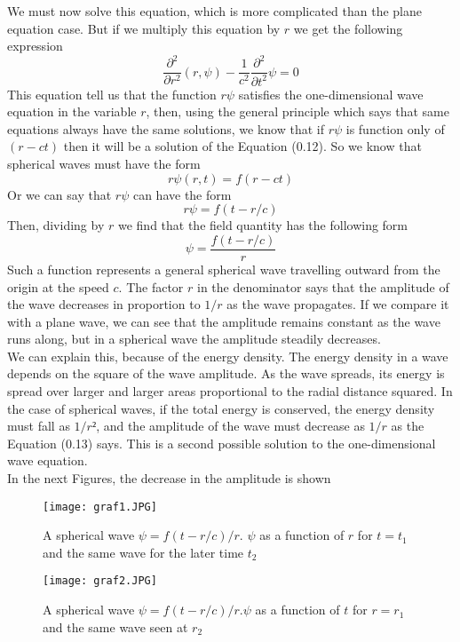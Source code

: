 \documentclass[paper=a4, fontsize=11pt]{scrartcl} %
\numberwithin{equation}{section} %
\numberwithin{figure}{section} %
\numberwithin{table}{section} %
\begin{document}
We must now solve this equation, which is more complicated than the plane equation case. But if we multiply this equation by $r$ we get the following 
expression
\begin{equation}
 \frac{\partial^2 }{\partial r^2}(r,\psi)-\frac{1}{c^2}\frac{\partial^2 }{\partial t^2}\psi=0
\end{equation}
This equation tell us that the function $r\psi$ satisfies the one-dimensional wave equation in the variable $r$, then, using the general principle
which says that same equations always have the same solutions, we know that if $r\psi$ is function only of $(r-ct)$ then it will be a solution of
the Equation (0.12). So we know that spherical waves must have the form
$$ r\psi(r,t)= f(r-ct)$$
Or we can say that $r\psi$ can have the form
$$ r\psi= f(t-r/c)$$
Then, dividing by $r$ we find that the field quantity has the following form
\begin{equation}
 \psi=\frac {f(t-r/c)}{r}
\end{equation}
Such a function represents a general spherical wave travelling outward from the origin at the speed $c$. The factor $r$ in the denominator says that
the amplitude of the wave decreases in proportion to $1/r$ as the wave propagates. If we compare it with a plane wave, we can see that the amplitude
remains constant as the wave runs along, but in a spherical wave the amplitude steadily decreases. \\
We can explain this, because of the energy density. The energy density in a wave depends on the square of the wave amplitude. As the wave spreads,
its energy is spread over larger and larger areas proportional to the radial distance squared. In the case of spherical waves, if the total 
energy is conserved, the energy density must fall as $1/r²$, and the amplitude of the wave must decrease as $1/r$ as the Equation (0.13) says. This 
is a second possible solution to the one-dimensional wave equation.\\
In the next Figures, the decrease in the amplitude is shown
\begin{figure}[h!] 
\centering
\texttt{[image: graf1.JPG]}
\caption{A spherical wave $\psi= {f(t-r/c)}/{r}$. $\psi$ as a function of $r$ for $t=t_1$ and the same wave for the later time $t_2$}
\label{graf1.JPG}
\end{figure}

\begin{figure}[h!] 
\centering
\texttt{[image: graf2.JPG]}
\caption{A spherical wave $\psi= {f(t-r/c)}/{r}$.$\psi$ as a function of $t$ for $r=r_1$ and the same wave seen at $r_2$}
\label{graf2.JPG}
\end{figure}
\end{document}
